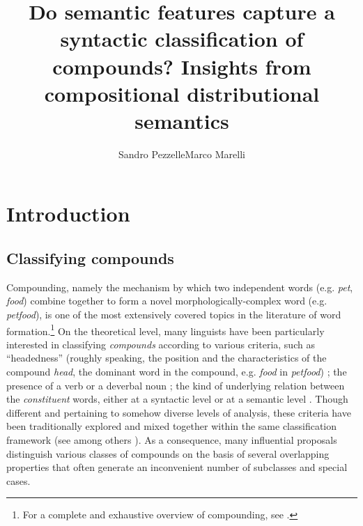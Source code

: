 \documentclass[output=paper]{langsci/langscibook}
\title{Do semantic features capture a syntactic classification of compounds? Insights from compositional distributional semantics}
\author{Sandro Pezzelle\affiliation{Institute for Logic, Language and Computation, University of Amsterdam}\lastand Marco Marelli\affiliation{Department of Psychology, University of Milano-Bicocca}}
\begin{document}
\maketitle

\section{Introduction}
\label{sec:introduction}

\subsection{Classifying compounds}\label{sec:class}


Compounding, namely the mechanism by which two independent words (e.g. \emph{pet}, \emph{food}) combine together to form a novel morphologically-complex word (e.g. \emph{petfood}), is one of the most extensively covered topics in the literature of word formation.\footnote{For a complete and exhaustive overview of compounding, see \cite{OHC}.} On the theoretical level, many linguists have been particularly interested in classifying \emph{compounds} according to various criteria, such as ``headedness'' (roughly speaking, the position and the characteristics of the compound \emph{head}, the dominant word in the compound, e.g. \emph{food} in \emph{petfood}) \citep{Bloomfield1933,fabb1998}; the presence of a verb or a deverbal noun \citep{marchand1969}; the kind of underlying relation between the \emph{constituent} words, either at a syntactic level \citep{Bloomfield1933,bally1950,lees1960,SB2005,baroni2006,dressler2006,sbOHC} or at a semantic level \citep{levi1978,warren1978,fanselow1981}. Though different and pertaining to somehow diverse levels of analysis, these criteria have been traditionally explored and mixed together within the same classification framework (see among others \citealt{bauer2001,hasp2002,Booij2005}). As a consequence, many influential proposals distinguish various classes of compounds on the basis of several overlapping properties that often generate an inconvenient number of subclasses and special cases.
\end{document}
